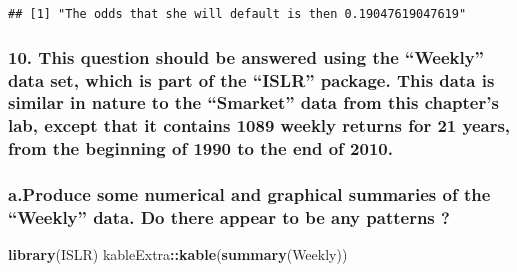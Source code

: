 \documentclass[]{article}
\newenvironment{Shaded}{\begin{snugshade}}{\end{snugshade}}
\newcommand{\KeywordTok}[1]{\textcolor[rgb]{0.13,0.29,0.53}{\textbf{#1}}}
\newcommand{\OperatorTok}[1]{\textcolor[rgb]{0.81,0.36,0.00}{\textbf{#1}}}
\newcommand{\NormalTok}[1]{#1}
\begin{document}
\begin{verbatim}
## [1] "The odds that she will default is then 0.19047619047619"
\end{verbatim}

\subsubsection{\texorpdfstring{10. This question should be answered
using the ``Weekly'' data set, which is part of the ``ISLR'' package.
This data is similar in nature to the ``Smarket'' data from this
chapter's lab, except that it contains 1089 weekly returns for 21 years,
from the beginning of 1990 to the end of
2010.}{10. This question should be answered using the Weekly data set, which is part of the ISLR package. This data is similar in nature to the Smarket data from this chapter's lab, except that it contains 1089 weekly returns for 21 years, from the beginning of 1990 to the end of 2010.}}\label{this-question-should-be-answered-using-the-weekly-data-set-which-is-part-of-the-islr-package.-this-data-is-similar-in-nature-to-the-smarket-data-from-this-chapters-lab-except-that-it-contains-1089-weekly-returns-for-21-years-from-the-beginning-of-1990-to-the-end-of-2010.}

\subsubsection{\texorpdfstring{a.Produce some numerical and graphical
summaries of the ``Weekly'' data. Do there appear to be any patterns
?}{a.Produce some numerical and graphical summaries of the Weekly data. Do there appear to be any patterns ?}}\label{a.produce-some-numerical-and-graphical-summaries-of-the-weekly-data.-do-there-appear-to-be-any-patterns}

\begin{Shaded}
\begin{Highlighting}[]
\KeywordTok{library}\NormalTok{(ISLR)}
\NormalTok{kableExtra}\OperatorTok{::}\KeywordTok{kable}\NormalTok{(}\KeywordTok{summary}\NormalTok{(Weekly))}
\end{Highlighting}
\end{Shaded}
\end{document}
